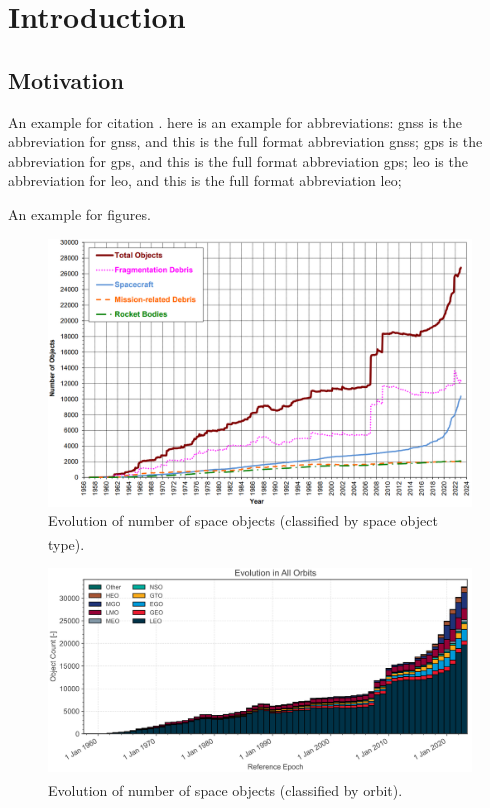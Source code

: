 \chapter{Introduction}\label{ch:intro}
    \section{Motivation}\label{sec:motiv}
        An example for citation \cite{Hinks2013}. here is an example for abbreviations: \acrshort{gnss} is the abbreviation for \acrlong{gnss}, and this is the full format abbreviation \acrfull{gnss}; \acrshort{gps} is the abbreviation for \acrlong{gps}, and this is the full format abbreviation \acrfull{gps}; \acrshort{leo} is the abbreviation for \acrlong{leo}, and this is the full format abbreviation \acrfull{leo}; 
        
        \lipsum[1]

        An example for figures. 
        \begin{figure}[!ht]
            \centering
            \includegraphics[width=1.0\textwidth]{figures/evo_typ.png}
            \caption[Evolution of number of space objects
            (classified by space object type)]{Evolution of number of space objects
            (classified by space object type)\textsuperscript{\cite{nasa2023}}.}\label{fig:evo_typ}
        \end{figure}
        \begin{figure}[!ht]
            \centering
            \includegraphics[width=1.0\textwidth]{figures/evo_orb.png}
            \caption[Evolution of number of space objects
            (classified by orbit)]{Evolution of number of space objects
            (classified by orbit)\textsuperscript{\cite{esa2023}}.}\label{fig:evo_orb}
        \end{figure}

